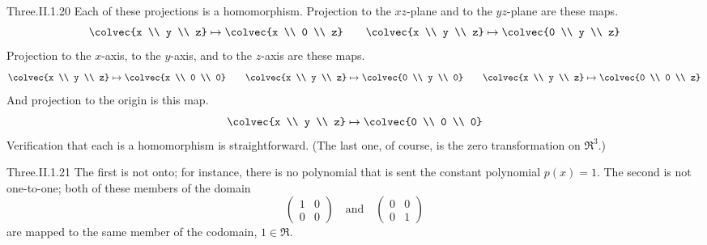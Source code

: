 \begin{ans}{Three.II.1.20}
      Each of these projections is a homomorphism.
      Projection to the $xz$-plane and to the $yz$-plane are these maps.
      \begin{equation*}
         \colvec{x \\ y \\ z}\mapsto\colvec{x \\ 0 \\ z}
           \qquad
         \colvec{x \\ y \\ z}\mapsto\colvec{0 \\ y \\ z}
      \end{equation*}
      Projection to the $x$-axis, to the $y$-axis, and to the $z$-axis are
      these maps.
      \begin{equation*}
         \colvec{x \\ y \\ z}\mapsto\colvec{x \\ 0 \\ 0}
           \qquad
         \colvec{x \\ y \\ z}\mapsto\colvec{0 \\ y \\ 0}
           \qquad
         \colvec{x \\ y \\ z}\mapsto\colvec{0 \\ 0 \\ z}
      \end{equation*}
      And projection to the origin is this map.
      \begin{equation*}
         \colvec{x \\ y \\ z}\mapsto\colvec{0 \\ 0 \\ 0}
      \end{equation*}
      Verification that each is a homomorphism is straightforward.
      (The last one, of course, is the zero transformation on $\Re^3$.)
     
\end{ans}
\begin{ans}{Three.II.1.21}
      The first is not onto; for instance, there is no polynomial that is
      sent the constant polynomial $p(x)=1$.
      The second is not  one-to-one; both of these members of the domain
      \begin{equation*}
        \begin{pmatrix}
          1  &0  \\
          0  &0
        \end{pmatrix}
        \quad\text{and}\quad
        \begin{pmatrix}
          0  &0  \\
          0  &1
        \end{pmatrix}
      \end{equation*}
      are mapped to the same member of the codomain, $1\in\Re$.
     
\end{ans}
